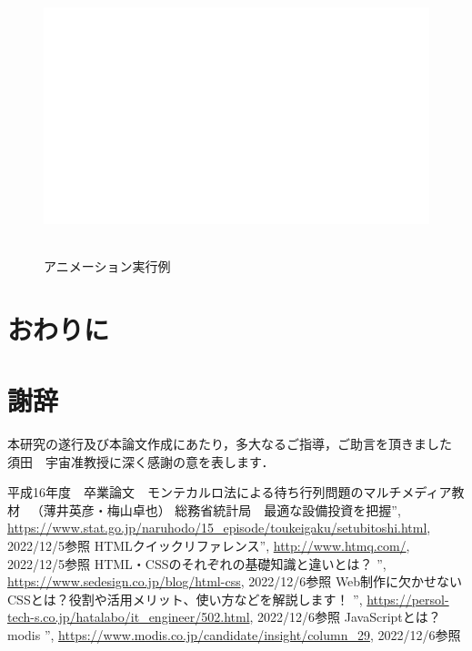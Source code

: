 \documentclass[12pt,a4j]{ltjsarticle}
\begin{document}
\begin{figure}[h]
\begin{center}
\includegraphics[height = 80mm ] {figures/figure_sample.pdf}
\caption{アニメーション実行例}
\end{center}
\label{fig:layout_ex}
\end{figure}

\clearpage


\section{おわりに}

\clearpage

\section{謝辞}
本研究の遂行及び本論文作成にあたり，多大なるご指導，ご助言を頂きました  須田　宇宙准教授に深く感謝の意を表します．
\clearpage

\begin{thebibliography}{99}
平成16年度　卒業論文　モンテカルロ法による待ち行列問題のマルチメディア教材 　（薄井英彦・梅山卓也）
 総務省統計局　最適な設備投資を把握”, \url{https://www.stat.go.jp/naruhodo/15_episode/toukeigaku/setubitoshi.html}, 2022/12/5参照
 HTMLクイックリファレンス”, \url{http://www.htmq.com/}, 2022/12/5参照
HTML・CSSのそれぞれの基礎知識と違いとは？ ”, \url{https://www.sedesign.co.jp/blog/html-css}, 2022/12/6参照
Web制作に欠かせないCSSとは？役割や活用メリット、使い方などを解説します！ ”, \url{https://persol-tech-s.co.jp/hatalabo/it_engineer/502.html}, 2022/12/6参照
JavaScriptとは？　modis ”, \url{https://www.modis.co.jp/candidate/insight/column_29}, 2022/12/6参照
\end{thebibliography}
\end{document}
